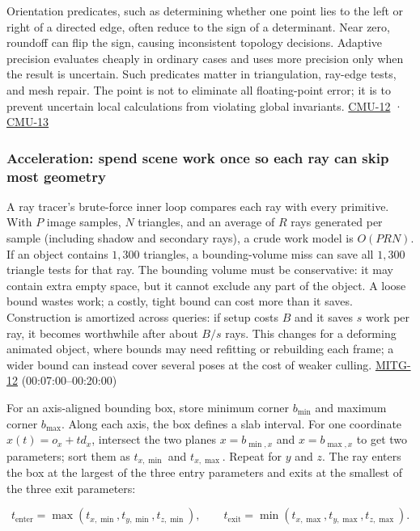 Orientation predicates, such as determining whether one point lies to the left or right of a directed edge, often reduce to the sign of a determinant. Near zero, roundoff can flip the sign, causing inconsistent topology decisions. Adaptive precision evaluates cheaply in ordinary cases and uses more precision only when the result is uncertain. Such predicates matter in triangulation, ray-edge tests, and mesh repair. The point is not to eliminate all floating-point error; it is to prevent uncertain local calculations from violating global invariants. \hyperref[04-visual-computing-ii-ch036]{CMU-12} · \hyperref[04-visual-computing-ii-ch036]{CMU-13}

\subsubsection{Acceleration: spend scene work once so each ray can skip most geometry}\label{acceleration-spend-scene-work-once-so-each-ray-can-skip-most-geometry}

A ray tracer's brute-force inner loop compares each ray with every primitive. With \(P\) image samples, \(N\) triangles, and an average of \(R\) rays generated per sample (including shadow and secondary rays), a crude work model is \(O(PRN)\). If an object contains \(1{,}300\) triangles, a bounding-volume miss can save all \(1{,}300\) triangle tests for that ray. The bounding volume must be conservative: it may contain extra empty space, but it cannot exclude any part of the object. A loose bound wastes work; a costly, tight bound can cost more than it saves. Construction is amortized across queries: if setup costs \(B\) and it saves \(s\) work per ray, it becomes worthwhile after about \(B/s\) rays. This changes for a deforming animated object, where bounds may need refitting or rebuilding each frame; a wider bound can instead cover several poses at the cost of weaker culling. \hyperref[04-visual-computing-ii-ch036]{MITG-12} (00:07:00--00:20:00)

For an axis-aligned bounding box, store minimum corner \(b_{\min}\) and maximum corner \(b_{\max}\). Along each axis, the box defines a slab interval. For one coordinate \(x(t)=o_x+td_x\), intersect the two planes \(x=b_{\min,x}\) and \(x=b_{\max,x}\) to get two parameters; sort them as \(t_{x,\min}\) and \(t_{x,\max}\). Repeat for \(y\) and \(z\). The ray enters the box at the largest of the three entry parameters and exits at the smallest of the three exit parameters:

\[
t_{\mathrm{enter}}=\max(t_{x,\min},t_{y,\min},t_{z,\min}),\qquad
t_{\mathrm{exit}}=\min(t_{x,\max},t_{y,\max},t_{z,\max}).
\]

